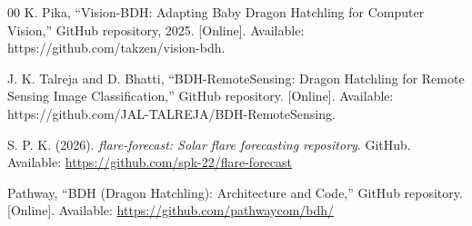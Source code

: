 \documentclass[oneside]{ieeeaccess}
\begin{document}
\begin{thebibliography}{00}
K. Pika,
``Vision-BDH: Adapting Baby Dragon Hatchling for Computer Vision,''
GitHub repository, 2025.
[Online]. Available: https://github.com/takzen/vision-bdh.

J. K. Talreja and D. Bhatti,
``BDH-RemoteSensing: Dragon Hatchling for Remote Sensing Image Classification,''
GitHub repository.
[Online]. Available: https://github.com/JAL-TALREJA/BDH-RemoteSensing.

S. P. K. (2026). \textit{flare-forecast: Solar flare forecasting repository}. GitHub. Available: \url{https://github.com/spk-22/flare-forecast}

Pathway, ``BDH (Dragon Hatchling): Architecture and Code,''
GitHub repository. [Online]. Available:
\url{https://github.com/pathwaycom/bdh/}
\end{thebibliography}

\EOD
\end{document}
